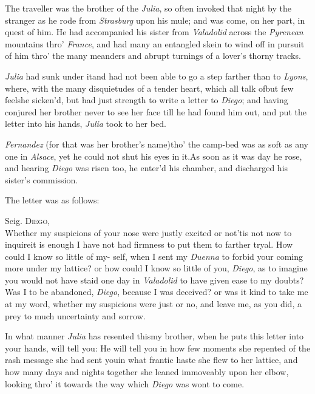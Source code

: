 \documentclass{article}
\begin{document}
The traveller was the brother of the \textit{Julia}, so often
invoked that night by the stranger as he rode from \textit{Strasburg}
upon his mule; and was come, on her part,\break 
in quest of him. He had accompanied\break
his sister from \textit{Valadolid} across the
\textit{Pyrenean} mountains thro’ \textit{France}, and had many an
entangled skein to wind off in pursuit of him thro’ the many
meanders and abrupt turnings of a lover’s thorny tracks.

\tsk \textit{Julia} had sunk under it\tsk and had
not been able to go a step farther than to \textit{Lyons}, where,
with the many disquietudes of a tender heart, which all talk
of\tsk but few feel\tsk she sicken’d, but had just
strength to write a letter to \textit{Diego}; and having conjured her
brother never to see her face till he had found him out, and put
the letter into his hands, \textit{Julia} took to her bed.

\textit{Fernandez} (for that was her brother’s
name)\tsh tho’ the camp-bed was as soft as any one
in \textit{Alsace}, yet he could not shut his eyes in
it.\tsk As soon as it was day he rose, and hearing
\textit{Diego} was risen too, he enter’d his chamber, and discharged his
sister’s commission.

The letter was as follows:

\newpage
\indent\quad Seig. \textsc{Diego},\\
\indent\lqq Whether my suspicions of your nose\break
\lqq were justly excited or not\tsk ’tis not now\break
\lqq to inquire\tsk it is enough I have not\break
\lqq had firmness to put them to farther\break
\lqq tryal.\break
\break
\indent\lqq How could I know so little of my-\break
\lqq self, when I sent my \textit{Duenna} to forbid\break
\lqq your coming more under my lattice?\break
\lqq or how could I know so little of you,\break
\lqq \textit{Diego}, as to imagine you would not\break
\lqq have staid one day in \textit{Valadolid} to have\break
\lqq given ease to my doubts?\tsk Was I to\break
\lqq be abandoned, \textit{Diego}, because I was\break
\lqq deceived? or was it kind to take me\break
\lqq at my word, whether my suspicions\break
\lqq were just or no, and leave me, as you\break
\lqq did, a prey to much uncertainty and\break
\lqq sorrow.\hfill

\newpage
\indent\lqq In what manner \textit{Julia} has resented\break
\lqq this\tsk my brother, when he puts this\break
\lqq letter into your hands, will tell you:\break
\lqq He will tell you in how few moments\break
\lqq she repented of the rash message she\break
\lqq had sent you\tsk in what frantic haste\break
\lqq she flew to her lattice, and how many\break
\lqq days and nights together she leaned\break
\lqq immoveably upon her elbow, looking\break
\lqq thro’ it towards the way which \textit{Diego}\break
\lqq was wont to come.\hfill
\end{document}

